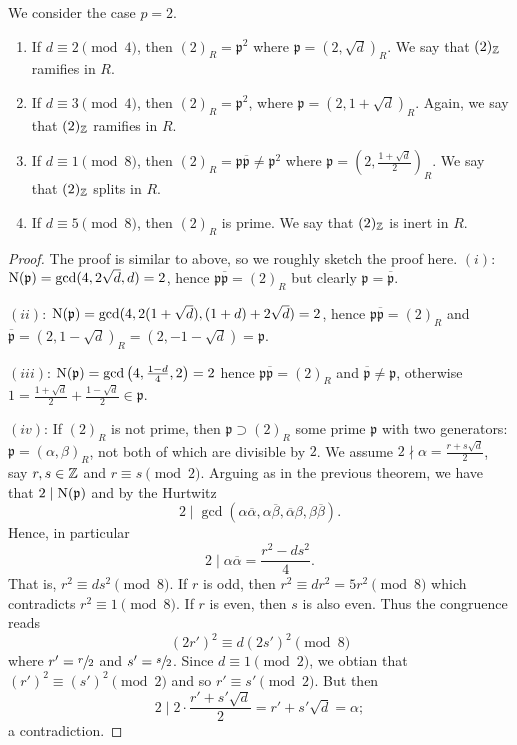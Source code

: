 \begin{theorem}
	We consider the case $p = 2$.
	\begin{enumerate}
		\item If $d \equiv 2 \pmod 4$, then $(2)_R = \mathfrak p^2$
		where $\mathfrak p = (2, \sqrt d)_R$.
		We say that $(2)_{\mathbb{Z}}$ ramifies in $R$.

		\item If $d \equiv 3 \pmod 4$, then $(2)_R = \mathfrak p^2$,
		where $\mathfrak p = (2, 1 + \sqrt d)_R$.
		Again, we say that $(2)_{\mathbb{Z}}$ ramifies in $R$.

		\item If $d \equiv 1 \pmod 8$, 
		then $(2)_R = \mathfrak p \overline{\mathfrak p} \neq \mathfrak p^2$
		where $\mathfrak p = \left( 2, \frac{1 + \sqrt d}2 \right)_R$.
		We say that $(2)_{\mathbb{Z}}$ splits in $R$.

		\item If $d \equiv 5 \pmod 8$, then $(2)_R$ is prime.
		We say that $(2)_{\mathbb{Z}}$ is inert in $R$.
	\end{enumerate}
\end{theorem}

\begin{proof}
	The proof is similar to above, so we roughly sketch the proof here.
	$(i)$: $\operatorname{N}(\mathfrak p) = \gcd(4, 2 \sqrt d, d) = 2$,
	hence $\mathfrak p \overline{\mathfrak p} = (2)_R$ but clearly
	$\mathfrak p = \overline{\mathfrak p}$.
	
	$(ii)$: $\operatorname{N}(\mathfrak p) 
	= \gcd(4, 2(1 + \sqrt d), (1 + d) + 2\sqrt d) = 2$, hence
	$\mathfrak p \overline{\mathfrak p} = (2)_R$ and 
	$\overline{\mathfrak p} = (2, 1 - \sqrt d)_R = (2, -1 - \sqrt d)
	= \mathfrak p$.

	$(iii)$: $\operatorname{N}(\mathfrak p) = \gcd\left( 4, \frac{1 - d}4, 2 \right) = 2$
	hence $\mathfrak p \overline{\mathfrak p} = (2)_R$ and
	$\overline{\mathfrak p} \neq \mathfrak p$,
	otherwise
	$1 = \frac{1 + \sqrt d}2 + \frac{1 - \sqrt d}2 \in \mathfrak p$.

	$(iv)$: If $(2)_R$ is not prime, then $ \mathfrak p \supset (2)_R$ 
	some prime $\mathfrak p$ with two generators:
	$\mathfrak p = (\alpha, \beta)_R$, not both of which are divisible
	by $2$.
	We assume $2 \nmid \alpha = \frac{r + s\sqrt d}2$, say $r,s \in \mathbb{Z}$ and 
	$r \equiv s \pmod 2$.
	Arguing as in the previous theorem, we have that
	$2 \mid \operatorname{N}(\mathfrak p)$ and by the Hurtwitz
	\[
		2 \mid \gcd(
			\alpha\overline\alpha,
			\alpha\overline\beta,
			\overline\alpha\beta,
			\beta\overline\beta
		).
	\]
	Hence, in particular
	\[
		2 \mid \alpha\overline\alpha = \frac{r^2 - ds^2}{4}.
	\]
	That is, $r^2 \equiv ds^2 \pmod 8$.
	If $r$ is odd, then
	$r^2 \equiv dr^2 = 5r^2 \pmod 8$ which contradicts
	$r^2 \equiv 1 \pmod 8$.
	If $r$ is even, then $s$ is also even.
	Thus the congruence reads
	\[(2r')^2 \equiv d(2s')^2 \pmod 8\]
	where $r' = \sfrac r2$ and $s' = \sfrac s2$.
	Since $d \equiv 1 \pmod 2$, we obtian that
	$(r')^2 \equiv (s')^2 \pmod 2$ and so
	$r' \equiv s' \pmod 2$.
	But then
	\[
		2 \mid 2 \cdot \frac{r' + s' \sqrt d}2
		= r' + s' \sqrt d
		= \alpha;
	\]
	a contradiction.
\end{proof}